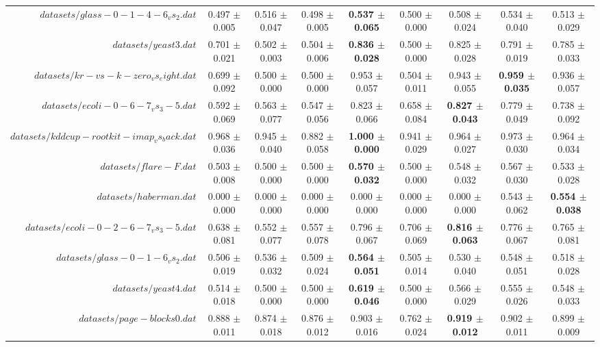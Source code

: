 \begin{table}[!ht]
{\begin{tabular}{r c c c c c c c c}
$datasets/glass-0-1-4-6_vs_2.dat$ & 0.497 $\pm$ 0.005 & 0.516 $\pm$ 0.047 & 0.498 $\pm$ 0.005 & \textbf{0.537 $\pm$ 0.065} & 0.500 $\pm$ 0.000 & 0.508 $\pm$ 0.024 & 0.534 $\pm$ 0.040 & 0.513 $\pm$ 0.029 \\
$datasets/yeast3.dat$ & 0.701 $\pm$ 0.021 & 0.502 $\pm$ 0.003 & 0.504 $\pm$ 0.006 & \textbf{0.836 $\pm$ 0.028} & 0.500 $\pm$ 0.000 & 0.825 $\pm$ 0.028 & 0.791 $\pm$ 0.019 & 0.785 $\pm$ 0.033 \\
$datasets/kr-vs-k-zero_vs_eight.dat$ & 0.699 $\pm$ 0.092 & 0.500 $\pm$ 0.000 & 0.500 $\pm$ 0.000 & 0.953 $\pm$ 0.057 & 0.504 $\pm$ 0.011 & 0.943 $\pm$ 0.055 & \textbf{0.959 $\pm$ 0.035} & 0.936 $\pm$ 0.057 \\
$datasets/ecoli-0-6-7_vs_3-5.dat$ & 0.592 $\pm$ 0.069 & 0.563 $\pm$ 0.077 & 0.547 $\pm$ 0.056 & 0.823 $\pm$ 0.066 & 0.658 $\pm$ 0.084 & \textbf{0.827 $\pm$ 0.043} & 0.779 $\pm$ 0.049 & 0.738 $\pm$ 0.092 \\
$datasets/kddcup-rootkit-imap_vs_back.dat$ & 0.968 $\pm$ 0.036 & 0.945 $\pm$ 0.040 & 0.882 $\pm$ 0.058 & \textbf{1.000 $\pm$ 0.000} & 0.941 $\pm$ 0.029 & 0.964 $\pm$ 0.027 & 0.973 $\pm$ 0.030 & 0.964 $\pm$ 0.034 \\
$datasets/flare-F.dat$ & 0.503 $\pm$ 0.008 & 0.500 $\pm$ 0.000 & 0.500 $\pm$ 0.000 & \textbf{0.570 $\pm$ 0.032} & 0.500 $\pm$ 0.000 & 0.548 $\pm$ 0.032 & 0.567 $\pm$ 0.030 & 0.533 $\pm$ 0.028 \\
$datasets/haberman.dat$ & 0.000 $\pm$ 0.000 & 0.000 $\pm$ 0.000 & 0.000 $\pm$ 0.000 & 0.000 $\pm$ 0.000 & 0.000 $\pm$ 0.000 & 0.000 $\pm$ 0.000 & 0.543 $\pm$ 0.062 & \textbf{0.554 $\pm$ 0.038} \\
$datasets/ecoli-0-2-6-7_vs_3-5.dat$ & 0.638 $\pm$ 0.081 & 0.552 $\pm$ 0.077 & 0.557 $\pm$ 0.078 & 0.796 $\pm$ 0.067 & 0.706 $\pm$ 0.069 & \textbf{0.816 $\pm$ 0.063} & 0.776 $\pm$ 0.067 & 0.765 $\pm$ 0.081 \\
$datasets/glass-0-1-6_vs_2.dat$ & 0.506 $\pm$ 0.019 & 0.536 $\pm$ 0.032 & 0.509 $\pm$ 0.024 & \textbf{0.564 $\pm$ 0.051} & 0.505 $\pm$ 0.014 & 0.530 $\pm$ 0.040 & 0.548 $\pm$ 0.051 & 0.518 $\pm$ 0.028 \\
$datasets/yeast4.dat$ & 0.514 $\pm$ 0.018 & 0.500 $\pm$ 0.000 & 0.500 $\pm$ 0.000 & \textbf{0.619 $\pm$ 0.046} & 0.500 $\pm$ 0.000 & 0.566 $\pm$ 0.029 & 0.555 $\pm$ 0.026 & 0.548 $\pm$ 0.033 \\
$datasets/page-blocks0.dat$ & 0.888 $\pm$ 0.011 & 0.874 $\pm$ 0.018 & 0.876 $\pm$ 0.012 & 0.903 $\pm$ 0.016 & 0.762 $\pm$ 0.024 & \textbf{0.919 $\pm$ 0.012} & 0.902 $\pm$ 0.011 & 0.899 $\pm$ 0.009 \\

\end{tabular}}
\end{table}
